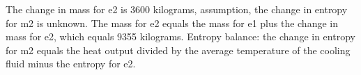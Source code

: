 The change in mass for e2 is 3600 kilograms, assumption, the change in entropy for m2 is unknown.
The mass for e2 equals the mass for e1 plus the change in mass for e2, which equals 9355 kilograms.
Entropy balance: the change in entropy for m2 equals the heat output divided by the average temperature of the cooling fluid minus the entropy for e2.